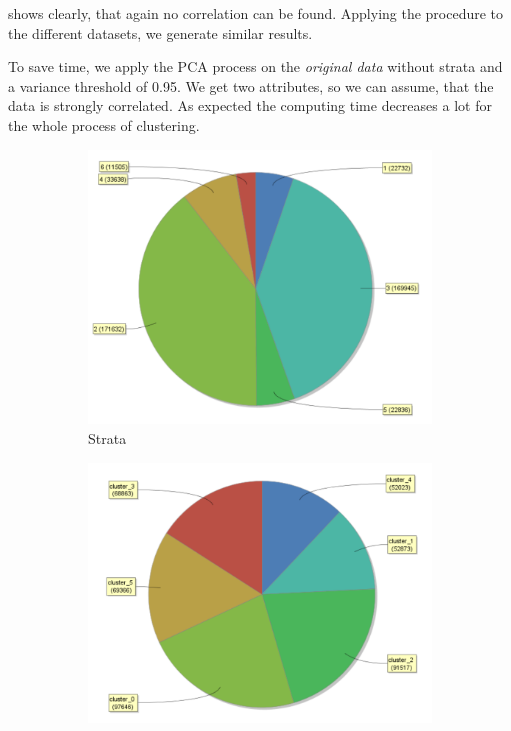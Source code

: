  shows clearly, that again no correlation can be found. Applying the procedure to the different datasets, we generate similar results.


To save time, we apply the PCA process on the \textit{original data} without strata and a variance
threshold of 0.95. We get two attributes, so we can assume, that the data is strongly correlated. As expected the computing time decreases a lot for the whole process of clustering. 


\begin{figure}[H]
\vspace*{-1em}
\centering
\begin{subfigure}{.3\textwidth}
  \centering
  \includegraphics[width=.9\linewidth]{ClusterPCAOrigRapidStrata.PNG}
  \caption{Strata}
  \label{fig:PCAOrgSt}
\end{subfigure}%
\begin{subfigure}{.3\textwidth}
  \centering
  \includegraphics[width=.9\linewidth]{ClusterPCAOrigRapidCluster.PNG}

\end{subfigure}
\end{figure}
